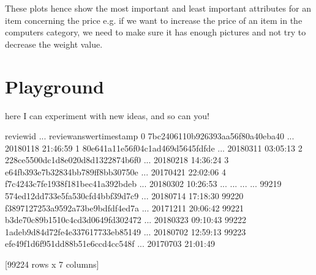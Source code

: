 \documentclass[letterpaper,10pt,english]{jupyterBook}
\begin{document}
\sphinxAtStartPar
These plots hence show the most important and least important attributes for an item concerning the price e.g. if we want to increase the price of an item in the computers category, we need to make sure it has enough pictures and not try to decrease the weight value.


\section{Playground}
\label{\detokenize{c7_case_studies/Olist:playground}}
\sphinxAtStartPar
here I can experiment with new ideas, and so can you!

\begin{sphinxVerbatim}[commandchars=\\\{\}]
\end{sphinxVerbatim}

\begin{sphinxVerbatim}[commandchars=\\\{\}]
                              review\PYGZus{}id  ... review\PYGZus{}answer\PYGZus{}timestamp
0      7bc2406110b926393aa56f80a40eba40  ...     2018\PYGZhy{}01\PYGZhy{}18 21:46:59
1      80e641a11e56f04c1ad469d5645fdfde  ...     2018\PYGZhy{}03\PYGZhy{}11 03:05:13
2      228ce5500dc1d8e020d8d1322874b6f0  ...     2018\PYGZhy{}02\PYGZhy{}18 14:36:24
3      e64fb393e7b32834bb789ff8bb30750e  ...     2017\PYGZhy{}04\PYGZhy{}21 22:02:06
4      f7c4243c7fe1938f181bec41a392bdeb  ...     2018\PYGZhy{}03\PYGZhy{}02 10:26:53
...                                 ...  ...                     ...
99219  574ed12dd733e5fa530cfd4bbf39d7c9  ...     2018\PYGZhy{}07\PYGZhy{}14 17:18:30
99220  f3897127253a9592a73be9bdfdf4ed7a  ...     2017\PYGZhy{}12\PYGZhy{}11 20:06:42
99221  b3de70c89b1510c4cd3d0649fd302472  ...     2018\PYGZhy{}03\PYGZhy{}23 09:10:43
99222  1adeb9d84d72fe4e337617733eb85149  ...     2018\PYGZhy{}07\PYGZhy{}02 12:59:13
99223  efe49f1d6f951dd88b51e6ccd4cc548f  ...     2017\PYGZhy{}07\PYGZhy{}03 21:01:49

[99224 rows x 7 columns]
\end{sphinxVerbatim}

\begin{sphinxVerbatim}[commandchars=\\\{\}]
     
\end{sphinxVerbatim}
\end{document}
